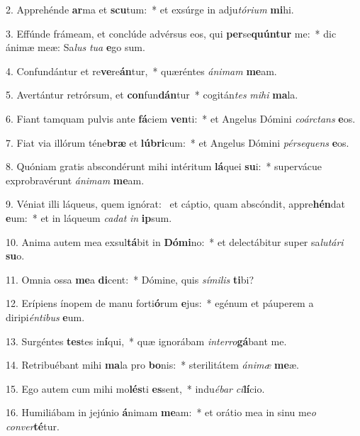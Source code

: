 2. Apprehénde \textbf{ar}ma et \textbf{scu}tum:~*  et exsúrge in adju\textit{tó}\textit{ri}\textit{um} \textbf{mi}hi.\

3. Effúnde frámeam, et conclúde advérsus eos, qui \textbf{per}se\textbf{quún}\textbf{tur} me:~*  dic ánimæ meæ: Sa\textit{lus} \textit{tu}\textit{a} \textbf{e}go sum.\

4. Confundántur et re\textbf{ve}re\textbf{án}tur,~*  quæréntes \textit{á}\textit{ni}\textit{mam} \textbf{me}am.\

5. Avertántur retrórsum, et \textbf{con}fun\textbf{dán}tur~*  cogitán\textit{tes} \textit{mi}\textit{hi} \textbf{ma}la.\

6. Fiant tamquam pulvis ante \textbf{fá}ciem \textbf{ven}ti:~*  et Angelus Dómini \textit{co}\textit{árc}\textit{tans} \textbf{e}os.\

7. Fiat via illórum téne\textbf{bræ} et \textbf{lú}\textbf{bri}cum:~*  et Angelus Dómini \textit{pér}\textit{se}\textit{quens} \textbf{e}os.\

8. Quóniam gratis abscondérunt mihi intéritum \textbf{lá}quei \textbf{su}i:~*  supervácue exprobravérunt \textit{á}\textit{ni}\textit{mam} \textbf{me}am.\

9. Véniat illi láqueus, quem ignórat: \dag\  et cáptio, quam abscóndit, appre\textbf{hén}dat \textbf{e}um:~*  et in láqueum \textit{ca}\textit{dat} \textit{in} \textbf{ip}sum.\

10. Anima autem mea exsul\textbf{tá}bit in \textbf{Dó}\textbf{mi}no:~*  et delectábitur super sa\textit{lu}\textit{tá}\textit{ri} \textbf{su}o.\

11. Omnia ossa \textbf{me}a \textbf{di}cent:~*  Dómine, quis \textit{sí}\textit{mi}\textit{lis} \textbf{ti}bi?\

12. Erípiens ínopem de manu forti\textbf{ó}rum \textbf{e}jus:~*  egénum et páuperem a diripi\textit{én}\textit{ti}\textit{bus} \textbf{e}um.\

13. Surgéntes \textbf{tes}tes in\textbf{í}qui,~*  quæ ignorábam \textit{in}\textit{ter}\textit{ro}\textbf{gá}bant me.\

14. Retribuébant mihi \textbf{ma}la pro \textbf{bo}nis:~*  sterilitátem \textit{á}\textit{ni}\textit{mæ} \textbf{me}æ.\

15. Ego autem cum mihi mo\textbf{lés}ti \textbf{es}sent,~*  indu\textit{é}\textit{bar} \textit{ci}\textbf{lí}cio.\

16. Humiliábam in jejúnio \textbf{á}nimam \textbf{me}am:~*  et orátio mea in sinu me\textit{o} \textit{con}\textit{ver}\textbf{té}tur.\

